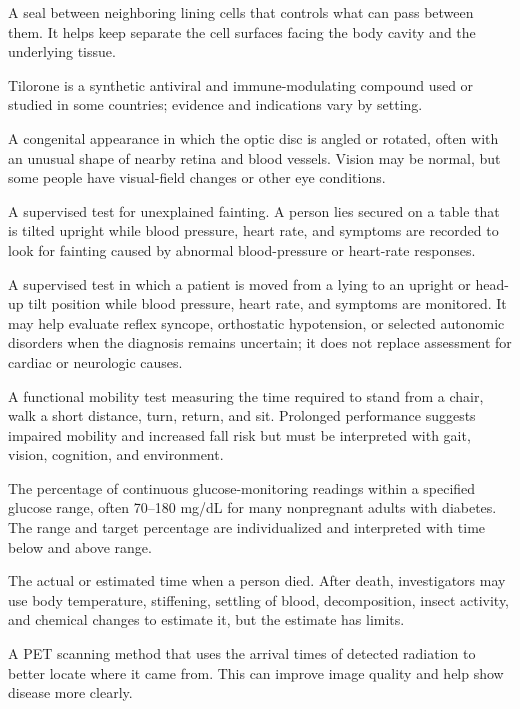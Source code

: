  A seal between neighboring lining cells that controls what can pass between them. It helps keep separate the cell surfaces facing the body cavity and the underlying tissue.

 Tilorone is a synthetic antiviral and immune-modulating compound used or studied in some countries; evidence and indications vary by setting.

 A congenital appearance in which the optic disc is angled or rotated, often with an unusual shape of nearby retina and blood vessels. Vision may be normal, but some people have visual-field changes or other eye conditions.

 A supervised test for unexplained fainting. A person lies secured on a table that is tilted upright while blood pressure, heart rate, and symptoms are recorded to look for fainting caused by abnormal blood-pressure or heart-rate responses.

 A supervised test in which a patient is moved from a lying to an upright or head-up tilt position while blood pressure, heart rate, and symptoms are monitored. It may help evaluate reflex syncope, orthostatic hypotension, or selected autonomic disorders when the diagnosis remains uncertain; it does not replace assessment for cardiac or neurologic causes.

 A functional mobility test measuring the time required to stand from a chair, walk a
short distance, turn, return, and sit. Prolonged performance suggests impaired mobility
and increased fall risk but must be interpreted with gait, vision, cognition, and
environment.

 The percentage of continuous glucose-monitoring readings within a specified glucose range, often 70--180 mg/dL for many nonpregnant adults with diabetes. The range and target percentage are individualized and interpreted with time below and above range.

 The actual or estimated time when a person died. After death, investigators may use body temperature, stiffening, settling of blood, decomposition, insect activity, and chemical changes to estimate it, but the estimate has limits.

 A PET scanning method that uses the arrival times of detected radiation to better locate where it came from. This can improve image quality and help show disease more clearly.

